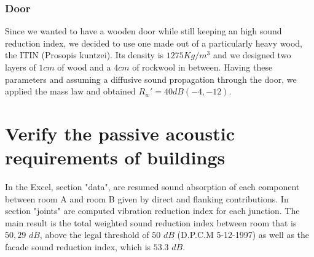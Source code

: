 \documentclass[]{scrartcl}
\begin{document}
\subsubsection{Door}
Since we wanted to have a wooden door while still keeping an high sound reduction index, we decided to use one made out of a particularly heavy wood, the ITIN (Prosopis kuntzei)\cite{wood}. Its density is $\mathit{1275 Kg/m^3}$ and we designed two layers of $\mathit{1 cm}$ of wood and a $\mathit{4 cm}$ of rockwool in between. Having these parameters and assuming a diffusive sound propagation through the door, we applied the mass law and obtained $R_w'= 40 dB (-4, -12)$. 

\section{Verify the passive acoustic requirements of buildings}  

In the Excel, section "data", are resumed sound absorption of each component between room A and room B given by direct and flanking contributions. In section "joints" are computed  vibration reduction index for each junction. The main result is the total weighted sound reduction index between room that is  $50,29$ $dB$, above the legal threshold of $50$ $dB$ (D.P.C.M 5-12-1997) as well as the facade sound reduction index, which is $53.3$ $dB$. 

\printbibliography
\end{document}
